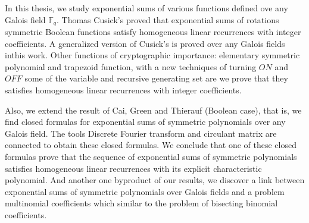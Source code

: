 
\bigskip  %


\vspace{0.1 in}


In this thesis, we study exponential sums of various functions defined ove any Galois field $\mathbb{F}_{q}$. Thomas Cusick's proved that exponential sums of rotations symmetric Boolean functions satisfy homogeneous linear recurrences with integer coefficients. A generalized version of Cusick's is proved over any Galois fields inthis work. Other functions of cryptographic importance: elementary symmetric polynomial and trapezoid function, with a new techniques of turning $ON$ and $OFF$ some of the variable and recursive generating set are we prove that they satisfies homogeneous linear recurrences with integer coefficients.

Also, we extend the result of Cai, Green and Thierauf (Boolean case), that is, we find closed formulas for exponential sums of symmetric polynomials over any Galois field. The tools Discrete Fourier transform and circulant matrix are connected to obtain these closed formulas. We conclude that one of these closed formulas prove that the sequence of exponential sums of symmetric polynomials satisfies homogeneous linear recurrences with its explicit characteristic polynomial. And another one byproduct of our results, we discover a link between exponential sums of symmetric polynomials over Galois fields and a problem multinomial coefficients which similar to the problem of bisecting binomial coefficients. 


